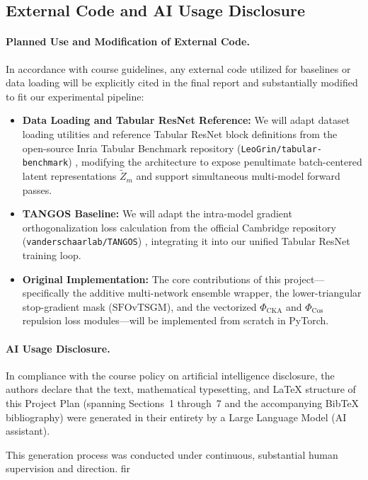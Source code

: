 \documentclass[11pt, a4paper]{article}
\begin{document}
\subsection{External Code and AI Usage Disclosure}

\paragraph{Planned Use and Modification of External Code.}
In accordance with course guidelines, any external code utilized for baselines or data loading will be explicitly cited in the final report and substantially modified to fit our experimental pipeline:
\begin{itemize}
    \item \textbf{Data Loading and Tabular ResNet Reference:} We will adapt dataset loading utilities and reference Tabular ResNet block definitions from the open-source Inria Tabular Benchmark repository (\texttt{LeoGrin/tabular-benchmark}) \cite{grinsztajn2022why}, modifying the architecture to expose penultimate batch-centered latent representations $\tilde{Z}_m$ and support simultaneous multi-model forward passes.
    \item \textbf{TANGOS Baseline:} We will adapt the intra-model gradient orthogonalization loss calculation from the official Cambridge repository (\texttt{vanderschaarlab/TANGOS}) \cite{jeffares2023tangos}, integrating it into our unified Tabular ResNet training loop.
    \item \textbf{Original Implementation:} The core contributions of this project—specifically the additive multi-network ensemble wrapper, the lower-triangular stop-gradient mask ($\text{SFOvTSGM}$), and the vectorized $\Phi_{\text{CKA}}$ and $\Phi_{\text{Cos}}$ repulsion loss modules—will be implemented from scratch in PyTorch.
\end{itemize}

\paragraph{AI Usage Disclosure.}
In compliance with the course policy on artificial intelligence disclosure, the authors declare that the text, mathematical typesetting, and LaTeX structure of this Project Plan (spanning Sections~1 through~7 and the accompanying BibTeX bibliography) were generated in their entirety by a Large Language Model (AI assistant). 

This generation process was conducted under continuous, substantial human supervision and direction. fir



\newpage

 
\end{document}
